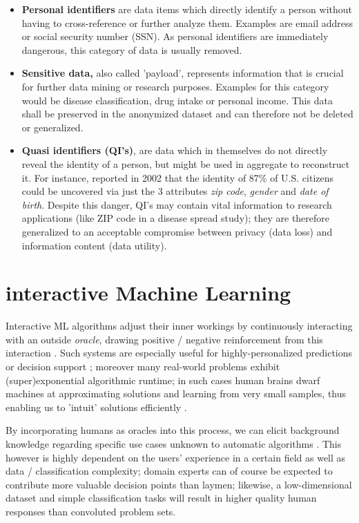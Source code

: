 \documentclass{llncs}
\begin{document}
\begin{itemize}
	\item \textbf{Personal identifiers} are data items which directly identify a person without having to cross-reference or further analyze them. Examples are email address or social security number (SSN). As personal identifiers are immediately dangerous, this category of data is usually removed.
	\item \textbf{Sensitive data,} also called 'payload', represents information that is crucial for further data mining or research purposes. Examples for this category would be disease classification, drug intake or personal income. This data shall be preserved in the anonymized dataset and can therefore not be deleted or generalized.
	\item \textbf{Quasi identifiers (QI's)}, are data which in themselves do not directly reveal the identity of a person, but might be used in aggregate to reconstruct it. For instance, \cite{sweeney2002k} reported in 2002 that the identity of 87\% of U.S. citizens could be uncovered via just the 3 attributes \textit{zip code}, \textit{gender} and \textit{date of birth}. Despite this danger, QI's may contain vital information to research applications (like ZIP code in a disease spread study); they are therefore generalized to an acceptable compromise between privacy (data loss) and information content (data utility).
\end{itemize}



\section{interactive Machine Learning}
\label{sect:iML}

Interactive ML algorithms adjust their inner workings by continuously interacting with an outside \textit{oracle}, drawing positive / negative reinforcement from this interaction \cite{2016HolzingeriML}. Such systems are especially useful for highly-personalized predictions or decision support \cite{2016KiesebergDITL}; moreover many real-world problems exhibit (super)exponential algorithmic runtime; in such cases human brains dwarf machines at approximating solutions and learning from very small samples, thus enabling us to 'intuit' solutions efficiently \cite{2016iMLExperiment}.

By incorporating humans as oracles into this process, we can elicit background knowledge regarding specific use cases unknown to automatic algorithms \cite{WARE2001}. This however is highly dependent on the users' experience in a certain field as well as data / classification complexity; domain experts can of course be expected to contribute more valuable decision points than laymen; likewise, a low-dimensional dataset and simple classification tasks will result in higher quality human responses than convoluted problem sets.
\end{document}
